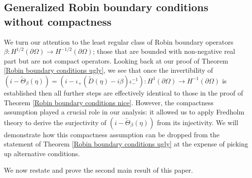 \documentclass{article}
\numberwithin{equation}{section}
\begin{document}
\subsection{Generalized Robin boundary conditions without compactness}\label{Robin uggliest section}
We turn our attention to the least regular class of Robin boundary operators $\beta:H^{1/2}(\partial \Omega)\to H^{-1/2}(\partial \Omega)$; those that are bounded with non-negative real part but are not compact operators. Looking back at our proof of Theorem \ref{Robin boundary conditions ugly}, we see that once the invertibility of $(i-\tilde\Theta_\beta(\eta))=(i - \iota_+(\tilde D(\eta)-i\beta)\iota_-^{-1}):H^{1}(\partial \Omega)\to H^{-1}(\partial \Omega)$ is established then all further steps are effectively identical to those in the proof of Theorem \ref{Robin boundary conditions nice}. 
However, the compactness assumption played a crucial role in our analysis: it allowed us to apply Fredholm theory to derive the surjectivity of $(i-\tilde\Theta_\beta(\eta))$ from its injectivity. We will demonstrate how this compactness assumption can be dropped from the statement of Theorem \ref{Robin boundary conditions ugly} at the expense of picking up alternative conditions. 
\par
We now restate and prove the second main result of this paper.
\end{document}
